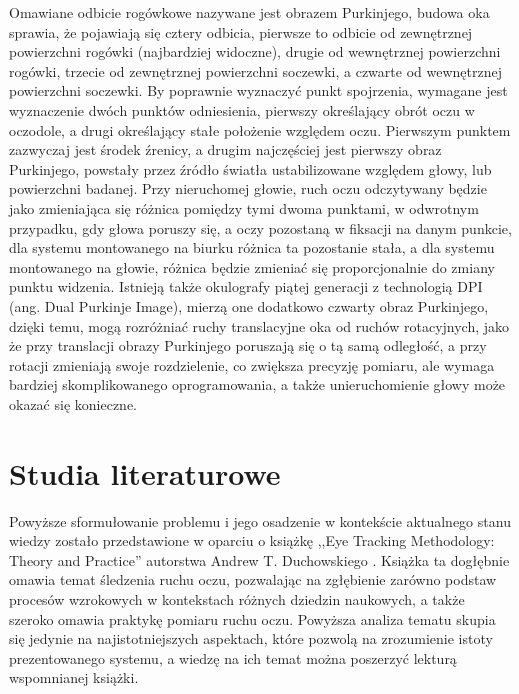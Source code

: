 \documentclass[a4paper,twoside,12pt]{book}
\begin{document}
Omawiane odbicie rogówkowe nazywane jest obrazem Purkinjego, budowa oka sprawia, że pojawiają się cztery odbicia, pierwsze to odbicie od zewnętrznej powierzchni rogówki (najbardziej widoczne), drugie od wewnętrznej powierzchni rogówki, trzecie od zewnętrznej powierzchni soczewki, a czwarte od wewnętrznej powierzchni soczewki. By poprawnie wyznaczyć punkt spojrzenia, wymagane jest wyznaczenie dwóch punktów odniesienia, pierwszy określający obrót oczu w oczodole, a drugi określający stałe położenie względem oczu. Pierwszym punktem zazwyczaj jest środek źrenicy, a drugim najczęściej jest pierwszy obraz Purkinjego, powstały przez źródło światła ustabilizowane względem głowy, lub powierzchni badanej. Przy nieruchomej głowie, ruch oczu odczytywany będzie jako zmieniająca się różnica pomiędzy tymi dwoma punktami, w odwrotnym przypadku, gdy głowa poruszy się, a oczy pozostaną w fiksacji na danym punkcie, dla systemu montowanego na biurku różnica ta pozostanie stała, a dla systemu montowanego na głowie, różnica będzie zmieniać się proporcjonalnie do zmiany punktu widzenia. Istnieją także okulografy piątej generacji z technologią DPI (ang. Dual Purkinje Image), mierzą one dodatkowo czwarty obraz Purkinjego, dzięki temu, mogą rozróżniać ruchy translacyjne oka od ruchów rotacyjnych, jako że przy translacji obrazy Purkinjego poruszają się o tą samą odległość, a przy rotacji zmieniają swoje rozdzielenie, co zwiększa precyzję pomiaru, ale wymaga bardziej skomplikowanego oprogramowania, a także unieruchomienie głowy może okazać się konieczne.

\section{Studia literaturowe}
\label{sec:studia-literaturowe}

Powyższe sformułowanie problemu i jego osadzenie w kontekście aktualnego stanu wiedzy zostało przedstawione w oparciu o książkę ,,Eye Tracking Methodology: Theory and Practice'' autorstwa Andrew T. Duchowskiego \cite{bib:eye-tracking-methodology}. Książka ta dogłębnie omawia temat śledzenia ruchu oczu, pozwalając na zgłębienie zarówno podstaw procesów wzrokowych w kontekstach różnych dziedzin naukowych, a także szeroko omawia praktykę pomiaru ruchu oczu. Powyższa analiza tematu skupia się jedynie na najistotniejszych aspektach, które pozwolą na zrozumienie istoty prezentowanego systemu, a wiedzę na ich temat można poszerzyć lekturą wspomnianej książki.
\end{document}
